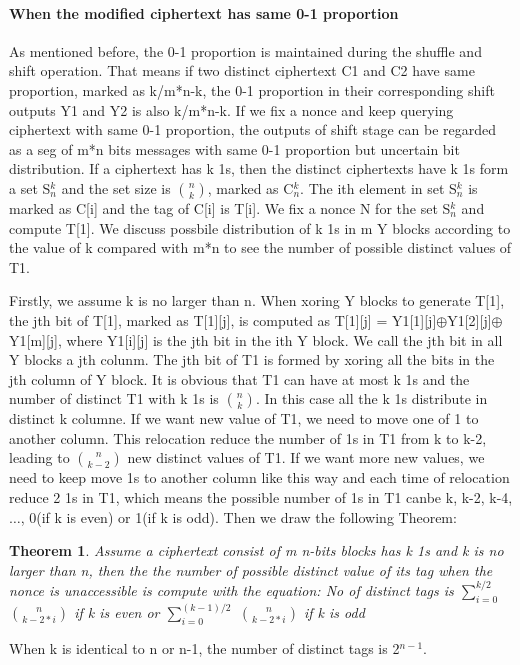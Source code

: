 \documentclass{article}
\newtheorem{theorem}{Theorem}[section]
\begin{document}
\paragraph{When the modified ciphertext has same 0-1 proportion}
As mentioned before, the 0-1 proportion is maintained during the shuffle and shift operation. That means if two distinct ciphertext C1 and C2 have same proportion, marked as k/m*n-k, the 0-1 proportion in their corresponding shift outputs Y1 and Y2 is also k/m*n-k.  
If we fix a nonce and keep querying ciphertext with same 0-1 proportion, the outputs of shift stage can be regarded as a seg of m*n bits messages with same 0-1 proportion but uncertain bit distribution. If a ciphertext has k 1s, then the distinct ciphertexts have k 1s form a set S$_{n}^{k}$ and the set size is $\binom{n}{k}$, marked as C$_{n}^{k}$. The ith element in set S$_{n}^{k}$ is marked as C[i] and the tag of C[i] is T[i].   
We fix a nonce N for the set S$_{n}^{k}$ and compute T[1]. We discuss possbile distribution of k 1s in m Y blocks according to the value of k compared with m*n to see the number of possible distinct values of T1. 

Firstly, we assume k is no larger than n. When xoring Y blocks to generate T[1], the jth bit of T[1], marked as T[1][j], is computed as T[1][j] = Y1[1][j]$\oplus$Y1[2][j]$\oplus$Y1[m][j], where Y1[i][j] is the jth bit in the ith Y block. We call the jth bit in all Y blocks a jth colunm. The jth bit of T1 is formed by xoring all the bits in the jth column of Y block.  It is obvious that T1 can have at most k 1s and the number of distinct T1 with k 1s is $\binom{n}{k}$. In this case all the k 1s distribute in distinct k columne.  If we want new value of T1, we need to move one of 1 to another column. This relocation reduce the number of 1s in T1 from k to k-2, leading to $\binom{n}{k-2}$ new distinct values of T1. If we want more new values, we need to keep move 1s to another column like this way and each time of relocation reduce 2 1s in T1, which means the possible number of 1s in T1 canbe k, k-2, k-4,$\ldots$, 0(if k is even) or 1(if k is odd). Then we draw the following Theorem:
\begin{theorem}
Assume a ciphertext consist of m n-bits blocks has k 1s and k is no larger than n, then the the number of possible distinct value of its tag when the nonce is unaccessible is compute with the equation:
No of distinct tags is $\sum_{i=0}^{k/2}$ $\binom{n}{k-2*i}$ if k is even or $\sum_{i=0}^{(k-1)/2}$ $\binom{n}{k-2*i}$ if k is odd
\end{theorem}
When k is identical to n or n-1, the number of distinct tags is 2$^{n-1}$.  
\end{document}
